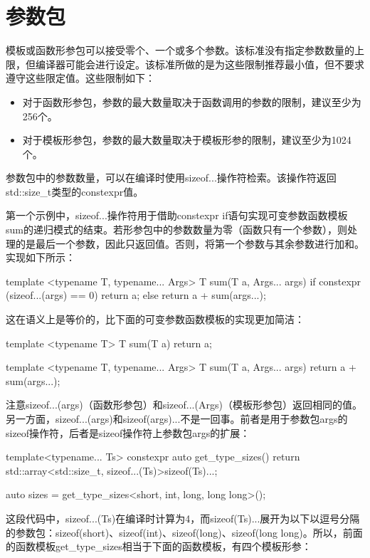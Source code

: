 \section{参数包}

模板或函数形参包可以接受零个、一个或多个参数。该标准没有指定参数数量的上限，但编译器可能会进行设定。该标准所做的是为这些限制推荐最小值，但不要求遵守这些限定值。这些限制如下：

\begin{itemize}
  \item 对于函数形参包，参数的最大数量取决于函数调用的参数的限制，建议至少为256个。
  \item 对于模板形参包，参数的最大数量取决于模板形参的限制，建议至少为1024个。
\end{itemize}

参数包中的参数数量，可以在编译时使用sizeof...操作符检索。该操作符返回std::size\_t类型的constexpr值。

第一个示例中，sizeof...操作符用于借助constexpr if语句实现可变参数函数模板sum的递归模式的结束。若形参包中的参数数量为零（函数只有一个参数），则处理的是最后一个参数，因此只返回值。否则，将第一个参数与其余参数进行加和。实现如下所示：

\begin{cpp}
template <typename T, typename... Args>
T sum(T a, Args... args)
{
	if constexpr (sizeof...(args) == 0)
		return a;
	else
		return a + sum(args...);
}
\end{cpp}

这在语义上是等价的，比下面的可变参数函数模板的实现更加简洁：

\begin{cpp}
template <typename T>
T sum(T a)
{
	return a;
}

template <typename T, typename... Args>
T sum(T a, Args... args)
{
	return a + sum(args...);
}
\end{cpp}

注意sizeof...(args)（函数形参包）和sizeof...(Args)（模板形参包）返回相同的值。另一方面，sizeof...(args)和sizeof(args)...不是一回事。前者是用于参数包args的sizeof操作符，后者是sizeof操作符上参数包args的扩展：

\begin{cpp}
template<typename... Ts>
constexpr auto get_type_sizes()
{
	return std::array<std::size_t,
	sizeof...(Ts)>{sizeof(Ts)...};
}

auto sizes = get_type_sizes<short, int, long, long long>();
\end{cpp}

这段代码中，sizeof...(Ts)在编译时计算为4，而sizeof(Ts)...展开为以下以逗号分隔的参数包：sizeof(short)、sizeof(int)、sizeof(long)、sizeof(long long)。所以，前面的函数模板get\_type\_sizes相当于下面的函数模板，有四个模板形参：

